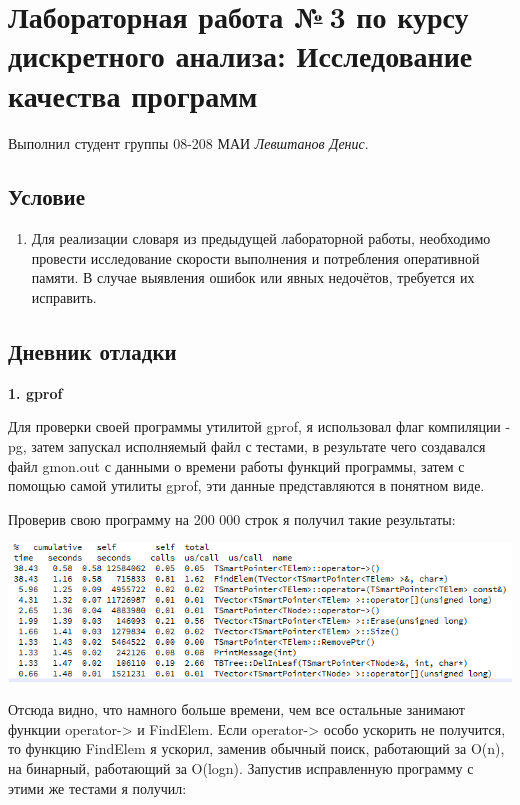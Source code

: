 \documentclass[12pt]{article}
\begin{document}
\section*{Лабораторная работа №\,3 по курсу дискретного анализа: Исследование качества программ}

Выполнил студент группы 08-208 МАИ \textit{Левштанов Денис}.

\subsection*{Условие}

\begin{enumerate}
\item Для реализации словаря из предыдущей лабораторной работы, необходимо провести исследование скорости выполнения и потребления оперативной памяти. В случае выявления ошибок или явных недочётов, требуется их исправить.

\end{enumerate}

\subsection*{Дневник отладки}

\par \textbf{1. gprof}
\par Для проверки своей программы утилитой gprof, я использовал флаг компиляции -pg, затем запускал исполняемый файл с тестами, в результате чего создавался файл gmon.out с данными о времени работы функций программы, затем с помощью самой утилиты gprof, эти данные представляются в понятном виде.
\par Проверив свою программу на 200 000 строк я получил такие результаты: 

\noindent \includegraphics{200k}

Отсюда видно, что намного больше времени, чем все остальные занимают функции operator-> и FindElem. Если operator-> особо ускорить не получится, то функцию FindElem я ускорил, заменив обычный поиск, работающий за O(n), на бинарный, работающий за O(logn). Запустив исправленную программу с этими же тестами я получил:
\end{document}

